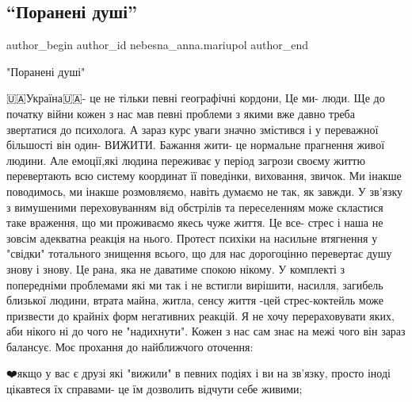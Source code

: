  
 
 
 
 

\subsection{\enquote{Поранені душі}}
\label{sec:19_04_2022.fb.nebesna_anna.mariupol.1.poraneni_dushi}

\ifcmt
 author_begin
   author_id nebesna_anna.mariupol
 author_end
\fi

"Поранені душі"

🇺🇦Україна🇺🇦- це не тільки певні географічні кордони, Це ми- люди. Ще до
початку війни кожен з нас мав певні проблеми з якими вже давно треба звертатися
до психолога. А зараз курс уваги значно змістився і у переважної більшості він
один- ВИЖИТИ. Бажання жити- це нормальне прагнення живої людини. Але емоції,які
людина переживає у період загрози своєму життю перевертають всю систему
координат її поведінки, виховання, звичок. Ми інакше поводимось, ми інакше
розмовляємо, навіть думаємо не так, як завжди. У зв'язку з вимушеними
переховуванням від обстрілів та переселенням може скластися таке враження, що
ми проживаємо якесь чуже життя. Це все- стрес і наша не зовсім адекватна
реакція на нього. Протест психіки на насильне втягнення у "свідки" тотального
знищення всього, що для нас дорогоцінно перевертає душу знову і знову. Це рана,
яка не даватиме спокою нікому. У комплекті з попередніми проблемами які ми так
і не встигли вирішити, насилля, загибель близької людини, втрата майна, житла,
сенсу життя -цей стрес-коктейль може призвести до крайніх форм негативних
реакцій. Я не хочу перераховувати яких, аби нікого ні до чого не "надихнути".
Кожен з нас сам знає на межі чого він зараз балансує. Моє прохання до
найближчого оточення: 

❤️якщо у вас є друзі які "вижили" в певних подіях і ви на зв'язку, просто іноді
цікавтеся їх справами- це їм дозволить відчути себе живими;


